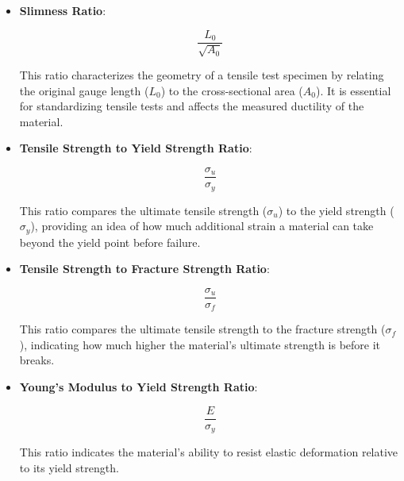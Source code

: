 \documentclass{article}
\begin{document}
\begin{itemize}

\item \textbf{Slimness Ratio}:\\[8pt]
\begin{minipage}{0.3\textwidth}
    \begin{equation}
        \frac{L_0}{\sqrt{A_0}}
    \end{equation}
\end{minipage}\hfill
\begin{minipage}{0.6\textwidth}
    This ratio characterizes the geometry of a tensile test specimen by relating the original gauge length (\(L_0\)) to the cross-sectional area (\(A_0\)). It is essential for standardizing tensile tests and affects the measured ductility of the material.
\end{minipage}

\item \textbf{Tensile Strength to Yield Strength Ratio}:\\[8pt]
\begin{minipage}{0.3\textwidth}
    \begin{equation}
        \frac{\sigma_u}{\sigma_y}
    \end{equation}
\end{minipage}\hfill
\begin{minipage}{0.6\textwidth}
    This ratio compares the ultimate tensile strength (\(\sigma_u\)) to the yield strength (\(\sigma_y\)), providing an idea of how much additional strain a material can take beyond the yield point before failure.
\end{minipage}

\item \textbf{Tensile Strength to Fracture Strength Ratio}:\\[8pt]
\begin{minipage}{0.3\textwidth}
    \begin{equation}
        \frac{\sigma_u}{\sigma_f}
    \end{equation}
\end{minipage}\hfill
\begin{minipage}{0.6\textwidth}
    This ratio compares the ultimate tensile strength to the fracture strength (\(\sigma_f\)), indicating how much higher the material's ultimate strength is before it breaks.
\end{minipage}

\item \textbf{Young’s Modulus to Yield Strength Ratio}:\\[8pt]
\begin{minipage}{0.3\textwidth}
    \begin{equation}
        \frac{E}{\sigma_y}
    \end{equation}
\end{minipage}\hfill
\begin{minipage}{0.6\textwidth}
    This ratio indicates the material's ability to resist elastic deformation relative to its yield strength.
\end{minipage}


\end{itemize}
\end{document}
